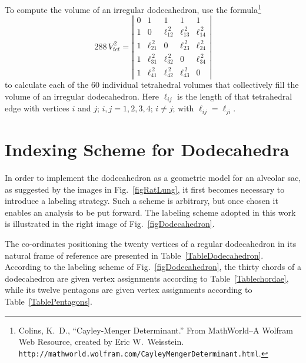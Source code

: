 To compute the volume of an irregular dodecahedron, use the formula\footnote{
	Colins, K.~D., ``Cayley-Menger Determinant.'' From MathWorld--A Wolfram Web Resource, created by Eric W.\ Weisstein. \texttt{http://mathworld.wolfram.com/Cayley\-MengerDeterminant.html}.
}
\begin{equation}
	288 \, V^{\,2}_{tet} = \left| \begin{matrix}
	0 & 1 & 1 & 1 & 1 \\
	1 & 0 & \ell_{12}^{\,2} & \ell_{13}^{\,2} & \ell_{14}^{\,2} \\
	1 & \ell_{21}^{\,2} & 0 & \ell_{23}^{\,2} & \ell_{24}^{\,2} \\
	1 & \ell_{31}^{\,2} & \ell_{32}^{\,2} & 0 & \ell_{34}^{\,2} \\
	1 & \ell_{41}^{\,2} & \ell_{42}^{\,2} & \ell_{43}^{\,2} & 0
	\end{matrix} \right|
	\label{tetrahedralVolume}
\end{equation}
to calculate each of the 60 individual tetrahedral volumes that collectively fill the volume of an irregular dodecahedron.  Here $\ell_{ij}$ is the length of that tetrahedral edge with vertices $i$ and $j$; $i, j = 1, 2, 3, 4$; $i \neq j$; with $\ell_{ij} = \ell_{ji}$.

\section{Indexing Scheme for Dodecahedra}
\label{sec:indexingDodecahedra}

In order to implement the dodecahedron as a geometric model for an alveolar sac, as suggested by the images in Fig.~\ref{figRatLung}, it first becomes necessary to introduce a labeling strategy. Such a scheme is arbitrary, but once chosen it enables an analysis to be put forward.  The labeling scheme adopted in this work is illustrated in the right image of Fig.~\ref{figDodecahedron}. 
  
The co-ordinates positioning the twenty vertices of a regular dodecahedron in its natural frame of reference are presented in Table~\ref{TableDodecahedron}.  According to the labeling scheme of Fig.~\ref{figDodecahedron}, the thirty chords of a dodecahedron are given vertex assignments according to Table~\ref{Tablechordae}, while its twelve pentagons are given vertex assignments according to Table~\ref{TablePentagons}.

